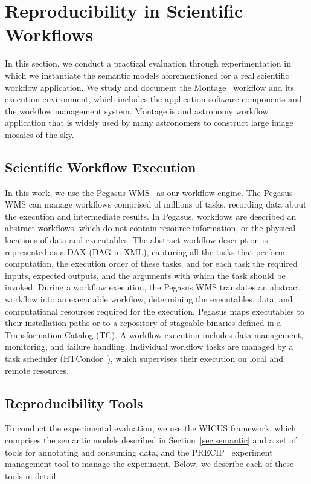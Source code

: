 \section{Reproducibility in Scientific Workflows}
\label{sec:reproducibility}

In this section, we conduct a practical evaluation through experimentation in which we instantiate the semantic models aforementioned for a real scientific workflow application. We study and document the Montage~\cite{Montage} workflow and its execution environment, which includes the application software components and the workflow management system. Montage is and astronomy workflow application that is widely used by many astronomers to construct large image mosaics of the sky.


\subsection{Scientific Workflow Execution}

In this work, we use the Pegasus WMS~\cite{Pegasus, Deelman-FGCS-2014} as our workflow engine. The Pegasus WMS can manage workflows comprised of millions of tasks, recording data about the execution and intermediate results. In Pegasus, workflows are described an abstract workflows, which do not contain resource information, or the physical locations of data and executables. The abstract workflow description is represented as a DAX (DAG in XML), capturing all the tasks that perform computation, the execution order of these tasks, and for each task the required inputs, expected outputs, and the arguments with which the task should be invoked. During a workflow execution, the Pegasus WMS translates an abstract workflow into an executable workflow, determining the executables, data, and computational resources required for the execution.
Pegasus maps executables to their installation paths or to a repository of stageable binaries defined in a Transformation Catalog (TC).
A workflow execution includes data management, monitoring, and failure handling. Individual workflow tasks are managed by a task scheduler (HTCondor~\cite{condor}), which supervises their execution on local and remote resources.


\subsection{Reproducibility Tools}

To conduct the experimental evaluation, we use the WICUS framework, which comprises the semantic models described in Section~\ref{sec:semantic} and a set of tools for annotating and consuming data, and the PRECIP~\cite{Azarnoosh-CRC-2013} experiment management tool to manage the experiment. Below, we describe each of these tools in detail.


